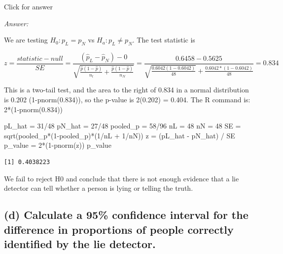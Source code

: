 \documentclass[
]{book}
\newenvironment{Shaded}{\begin{snugshade}}{\end{snugshade}}
\newcommand{\DecValTok}[1]{\textcolor[rgb]{0.00,0.00,0.81}{#1}}
\newcommand{\FunctionTok}[1]{\textcolor[rgb]{0.00,0.00,0.00}{#1}}
\newcommand{\NormalTok}[1]{#1}
\newcommand{\OtherTok}[1]{\textcolor[rgb]{0.56,0.35,0.01}{#1}}
\newcommand{\SpecialCharTok}[1]{\textcolor[rgb]{0.00,0.00,0.00}{#1}}
\begin{document}
Click for answer

\emph{Answer:}

We are testing \(H_0:p_L = p_N\) vs \(H_a:p_L \neq p_N\). The test statistic is

\[z = \frac{statistic-null}{SE} = \frac{(\hat{p}_L - \hat{p}_N) - 0}{\sqrt{\frac{\hat{p}(1-\hat{p})}{n_l} + \frac{\hat{p}(1-\hat{p})}{n_N}}} = \frac{0.6458 - 0.5625}{\sqrt{\frac{0.6042(1-0.6042)}{48}} + \frac{0.6042*(1-0.6042)}{48}} = 0.834 \]

This is a two-tail test, and the area to the right of 0.834 in a normal distribution is 0.202 (1-pnorm(0.834)), so the p-value is 2(0.202) = 0.404. The R command is: 2*(1-pnorm(0.834))

\begin{Shaded}
\begin{Highlighting}[]
\NormalTok{pL\_hat }\OtherTok{=} \DecValTok{31}\SpecialCharTok{/}\DecValTok{48}
\NormalTok{pN\_hat }\OtherTok{=} \DecValTok{27}\SpecialCharTok{/}\DecValTok{48}
\NormalTok{pooled\_p }\OtherTok{=} \DecValTok{58}\SpecialCharTok{/}\DecValTok{96}
\NormalTok{nL }\OtherTok{=} \DecValTok{48}
\NormalTok{nN }\OtherTok{=} \DecValTok{48}
\NormalTok{SE }\OtherTok{=} \FunctionTok{sqrt}\NormalTok{(pooled\_p}\SpecialCharTok{*}\NormalTok{(}\DecValTok{1}\SpecialCharTok{{-}}\NormalTok{pooled\_p)}\SpecialCharTok{*}\NormalTok{(}\DecValTok{1}\SpecialCharTok{/}\NormalTok{nL }\SpecialCharTok{+} \DecValTok{1}\SpecialCharTok{/}\NormalTok{nN))}
\NormalTok{z }\OtherTok{=}\NormalTok{ (pL\_hat }\SpecialCharTok{{-}}\NormalTok{ pN\_hat) }\SpecialCharTok{/}\NormalTok{ SE}
\NormalTok{p\_value }\OtherTok{=} \DecValTok{2}\SpecialCharTok{*}\NormalTok{(}\DecValTok{1}\SpecialCharTok{{-}}\FunctionTok{pnorm}\NormalTok{(z))}
\NormalTok{p\_value}
\end{Highlighting}
\end{Shaded}

\begin{verbatim}
[1] 0.4038223
\end{verbatim}

We fail to reject H0 and conclude that there is not enough evidence that a lie detector can tell whether a person is lying or telling the truth.

\hypertarget{d-calculate-a-95-confidence-interval-for-the-difference-in-proportions-of-people-correctly-identified-by-the-lie-detector.}{%
\subsection{(d) Calculate a 95\% confidence interval for the difference in proportions of people correctly identified by the lie detector.}\label{d-calculate-a-95-confidence-interval-for-the-difference-in-proportions-of-people-correctly-identified-by-the-lie-detector.}}
\end{document}
